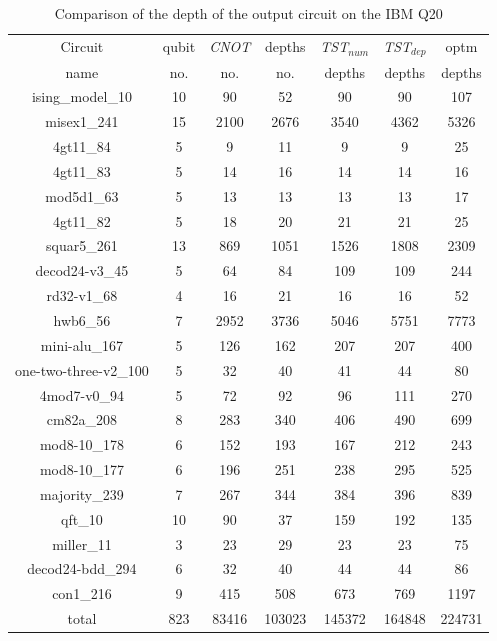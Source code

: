 \documentclass[runningheads]{llncs}
\begin{document}
							\begin{table}[H]
								\label{tab8}
								\begin{center}  
								\begin{tabular}{|c|c|c|c|c|c|c|}
								\hline
								Circuit &  qubit  & \textit{CNOT} &depths &\textit{TST$_{num}$}& \textit{TST$_{dep}$}  & optm 	  	\\
								 name	&   no. 	&	no. & no. & depths&  depths &  depths 	\\
								\hline
								ising\_model\_10 & 10 & 90 & 52 & 90 & 90 & 107 \\
								misex1\_241 & 15 & 2100 & 2676 & 3540 & 4362 & 5326 \\
								4gt11\_84 & 5 & 9 & 11 & 9 & 9 & 25 \\
								4gt11\_83 & 5 & 14 & 16 & 14 & 14 & 16 \\
								mod5d1\_63 & 5 & 13 & 13 & 13 & 13 & 17 \\
								4gt11\_82 & 5 & 18 & 20 & 21 & 21 & 25 \\
								squar5\_261 & 13 & 869 & 1051 & 1526 & 1808 & 2309 \\
								decod24-v3\_45 & 5 & 64 & 84 & 109 & 109 & 244 \\
								rd32-v1\_68 & 4 & 16 & 21 & 16 & 16 & 52 \\
								hwb6\_56 & 7 & 2952 & 3736 & 5046 & 5751 & 7773 \\
								mini-alu\_167 & 5 & 126 & 162 & 207 & 207 & 400 \\
								one-two-three-v2\_100 & 5 & 32 & 40 & 41 & 44 & 80 \\
								4mod7-v0\_94 & 5 & 72 & 92 & 96 & 111 & 270 \\
								cm82a\_208 & 8 & 283 & 340 & 406 & 490 & 699 \\
								mod8-10\_178 & 6 & 152 & 193 & 167 & 212 & 243 \\
								mod8-10\_177 & 6 & 196 & 251 & 238 & 295 & 525 \\
								majority\_239 & 7 & 267 & 344 & 384 & 396 & 839 \\
								qft\_10 & 10 & 90 & 37 & 159 & 192 & 135 \\
								miller\_11 & 3 & 23 & 29 & 23 & 23 & 75 \\
								decod24-bdd\_294 & 6 & 32 & 40 & 44 & 44 & 86 \\
								con1\_216 & 9 & 415 & 508 & 673 & 769 & 1197 \\
								\hline
								total & 823 & 83416 & 103023 & 145372 & 164848 & 224731  \\ 
							\hline
								\end{tabular} 
								\end{center}						
								\caption{Comparison of  the depth of the output circuit on the IBM Q20} 
								\label{tab8}\end{table}
\end{document}
